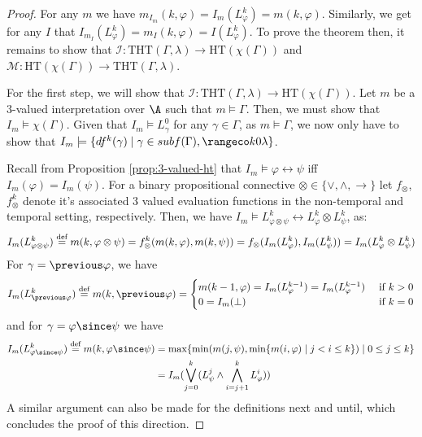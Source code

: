 \begin{proof}
  For any $m$ we have
  $m_{I_{m}}(k,\varphi) = I_m(L^k_\varphi) = m(k,\varphi)$. Similarly,
  we get for any $I$ that
  $I_{m_I}(L^k_\varphi) = m_I(k,\varphi) = I(L_{\varphi}^k)$.  To
  prove the theorem then, it remains to show that
  $\mathcal{I}: \text{THT}(\Gamma,\lambda) \rightarrow
  \text{HT}(\chi(\Gamma))$ and
  $\mathcal{M}: \text{HT}(\chi(\Gamma)) \rightarrow
  \text{THT}(\Gamma,\lambda)$.

  For the first step, we will show that
  $\mathcal{I}: \text{THT}(\Gamma,\lambda) \rightarrow
  \text{HT}(\chi(\Gamma))$. Let $m$ be a 3-valued interpretation over
  $\A$ such that $m \models \Gamma$. Then, we must show that
  $I_m \models \chi(\Gamma)$. Given that $I_m \models L^0_\gamma$ for
  any $\gamma \in \Gamma$, as $m \models \Gamma$, we now only have to
  show that
  $I_m \models \{ df^k(\gamma) \mid \gamma \in subf(\Gamma),
  \kinlambda \}$.

  Recall from Proposition \ref{prop:3-valued-ht} that
  $I_m \models \varphi \leftrightarrow \psi$ iff $I_m(\varphi) =
  I_m(\psi)$. For a binary propositional connective
  $\otimes \in \{ \vee, \wedge, \rightarrow \}$ let $f_{\otimes}$,
  $f_{\otimes}^k$ denote it's associated 3 valued evaluation functions
  in the non-temporal and temporal setting, respectively. Then, we
  have
  $I_m \models L^k_{\varphi \otimes \psi} \leftrightarrow L^k_\varphi
  \otimes L^k_\psi$, as:
  $$
  I_m(L^k_{\varphi \otimes \psi}) \stackrel{\text{def}}{=} m(k,\varphi \otimes \psi) 
  = f_{\otimes}^k(m(k,\varphi),m(k,\psi)) = f_{\otimes}(I_m(L^k_\varphi),I_m(L^k_\psi)) = I_m(L^k_{\varphi} \otimes L^k_{\psi})
  $$
  For $\gamma=\previous \varphi$, we have
  $$
  I_m(L^k_{\previous \varphi}) \defeq m(k,\previous \varphi) = \begin{cases}
    m(k-1,\varphi)=I_m(L^{k-1}_\varphi)=I_m(L^{k-1}_\varphi) &\text{ if } k > 0\\
    0=I_m(\bot) &\text{ if } k = 0
    \end{cases}
  $$
  and for $\gamma=\varphi \since \psi$ we have
  \begin{align*}
  I_m(L^k_{\varphi \since \psi}) \defeq m(k,\varphi \since \psi) &= \max \{\min (m(j, \psi), \min \{m(i, \varphi) \mid j<i \leq k\}) \mid 0 \leq j \leq k\} \\
    &= I_m(\bigvee_{j=0}^{k}(L_\psi^j \wedge \bigwedge_{i=j+1}^{k}L_{\varphi}^i))
  \end{align*}
  A similar argument can also be made for the definitions next and
  until, which concludes the proof of this direction.


\end{proof}
